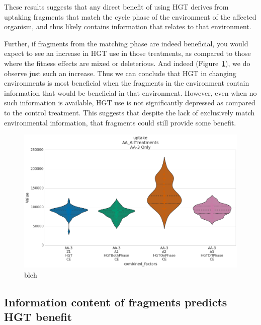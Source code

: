 \documentclass[PhD]{msu-thesis}
\begin{document}
These results suggests that any direct benefit of using HGT derives from uptaking fragments that match the cycle phase of the environment of the affected organism, and thus likely contains information that relates to that environment. %

Further, if fragments from the matching phase are indeed beneficial, you would expect to see an increase in HGT use in those treatments, as compared to those where the fitness effects are mixed or deleterious. And indeed (Figure~\ref{fig:hgt_use_by_cycle_phase_source}), we do observe just such an increase. Thus we can conclude that HGT in changing environments is most beneficial when the fragments in the environment contain information that would be beneficial in that environment. However, even when no such information is available, HGT use is not significantly depressed as compared to the control treatment. This suggests that despite the lack of exclusively match environmental information, that fragments could still provide some benefit. 

\begin{figure}[h!]
\begin{center}
\includegraphics[width=0.7\columnwidth]{figures/HGT/hgt_use_by_cycle_phase_source.png}
\caption{bleh%
}\label{fig:hgt_use_by_cycle_phase_source}
\end{center}
\end{figure}



\subsection{Information content of fragments predicts HGT benefit}
\end{document}
